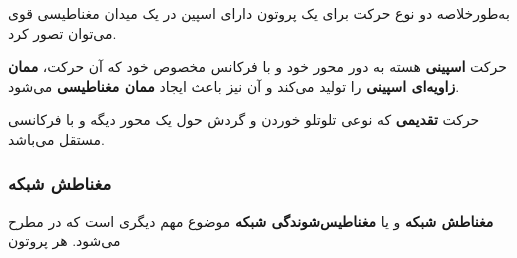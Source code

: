 به‌طور‌خلاصه دو نوع حرکت برای یک پروتون دارای اسپین در یک میدان مغناطیسی قوی می‌توان تصور کرد.

\begin{alphabetlist}
	\item
	حرکت \textbf{اسپینی} هسته به دور محور خود و با فرکانس مخصوص خود که آن حرکت، \textbf{ممان زاویه‌ای اسپینی }را تولید می‌کند و آن نیز باعث ایجاد \textbf{ممان مغناطیسی }می‌شود.
	\item
	حرکت \textbf{تقدیمی} که نوعی تلوتلو خوردن و  گردش حول یک محور دیگه و با فرکانسی مستقل می‌باشد.
\end{alphabetlist}


\subsubsection{مغناطش شبکه}
\textbf{مغناطش شبکه} و یا \textbf{مغناطیس‌شوندگی شبکه} 
موضوع مهم دیگری است که در \mri مطرح می‌شود.
هر پروتون 




